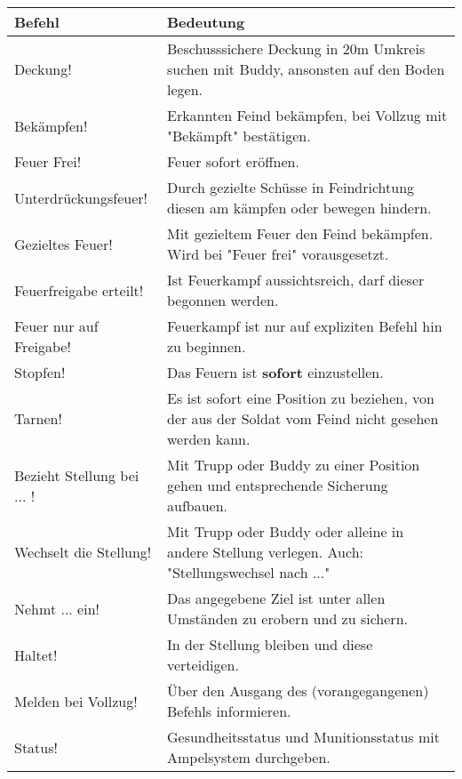 \begin{tabular}{|p{4cm}|p{9cm}|} \hline
	\textbf{Befehl} & \textbf{Bedeutung} \\ \hline
	Deckung! & Beschusssichere Deckung in 20m Umkreis suchen mit Buddy, ansonsten auf den Boden legen.\\ \hline
	Bekämpfen! & Erkannten Feind bekämpfen, bei Vollzug mit "Bekämpft" bestätigen.\\ \hline
	Feuer Frei! & Feuer sofort eröffnen.\\ \hline
	Unterdrückungsfeuer! & Durch gezielte Schüsse in Feindrichtung diesen am kämpfen oder bewegen hindern.\\ \hline
	Gezieltes Feuer! & Mit gezieltem Feuer den Feind bekämpfen. Wird bei "Feuer frei" vorausgesetzt.\\ \hline
	Feuerfreigabe erteilt! & Ist Feuerkampf aussichtsreich, darf dieser begonnen werden.\\ \hline
	Feuer nur auf Freigabe! & Feuerkampf ist nur auf expliziten Befehl hin zu beginnen.\\ \hline
	Stopfen! & Das Feuern ist \textbf{sofort} einzustellen.\\ \hline
	Tarnen! & Es ist sofort eine Position zu beziehen, von der aus der Soldat vom Feind nicht gesehen werden kann.\\ \hline
	Bezieht Stellung bei ... ! & Mit Trupp oder Buddy zu einer Position gehen und entsprechende Sicherung aufbauen.\\ \hline
	Wechselt die Stellung! & Mit Trupp oder Buddy oder alleine in andere Stellung verlegen. Auch: "Stellungswechsel nach ..."\\ \hline
	Nehmt ... ein! & Das angegebene Ziel ist unter allen Umständen zu erobern und zu sichern.\\ \hline
	Haltet! & In der Stellung bleiben und diese verteidigen.\\ \hline
	Melden bei Vollzug! & Über den Ausgang des (vorangegangenen) Befehls informieren. \\ \hline
	Status! & Gesundheitsstatus und Munitionsstatus mit Ampelsystem durchgeben.\\ \hline
\end{tabular}
